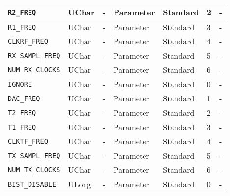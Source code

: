 \documentclass{article}
\begin{document}
\begin{landscape}
\begin{scriptsize}
\begin{longtable}{|p{3.6cm}|p{8.1cm}|p{1.4cm}|p{1.3cm}|p{1.4cm}|p{2.5cm}|p{3.6cm}|}
			\hline
      \verb+R2_FREQ+                   & UChar        & -               & Parameter             & Standard                         & 2                   & - \\
			\hline
      \verb+R1_FREQ+                   & UChar        & -               & Parameter             & Standard                         & 3                   & - \\
			\hline
      \verb+CLKRF_FREQ+                & UChar        & -               & Parameter             & Standard                         & 4                   & - \\
			\hline
      \verb+RX_SAMPL_FREQ+             & UChar        & -               & Parameter             & Standard                         & 5                   & - \\
			\hline
      \verb+NUM_RX_CLOCKS+             & UChar        & -               & Parameter             & Standard                         & 6                   & - \\
			\hline
      \verb+IGNORE+                    & UChar        & -               & Parameter             & Standard                         & 0                   & - \\
			\hline
      \verb+DAC_FREQ+                  & UChar        & -               & Parameter             & Standard                         & 1                   & - \\
			\hline
      \verb+T2_FREQ+                   & UChar        & -               & Parameter             & Standard                         & 2                   & - \\
			\hline
      \verb+T1_FREQ+                   & UChar        & -               & Parameter             & Standard                         & 3                   & - \\
			\hline
      \verb+CLKTF_FREQ+                & UChar        & -               & Parameter             & Standard                         & 4                   & - \\
			\hline
      \verb+TX_SAMPL_FREQ+             & UChar        & -               & Parameter             & Standard                         & 5                   & - \\
			\hline
      \verb+NUM_TX_CLOCKS+             & UChar        & -               & Parameter             & Standard                         & 6                   & - \\
			\hline
      \verb+BIST_DISABLE+              & ULong        & -               & Parameter             & Standard                         & 0                   & - \\

\end{longtable}
\end{scriptsize}
\end{landscape}
\end{document}
